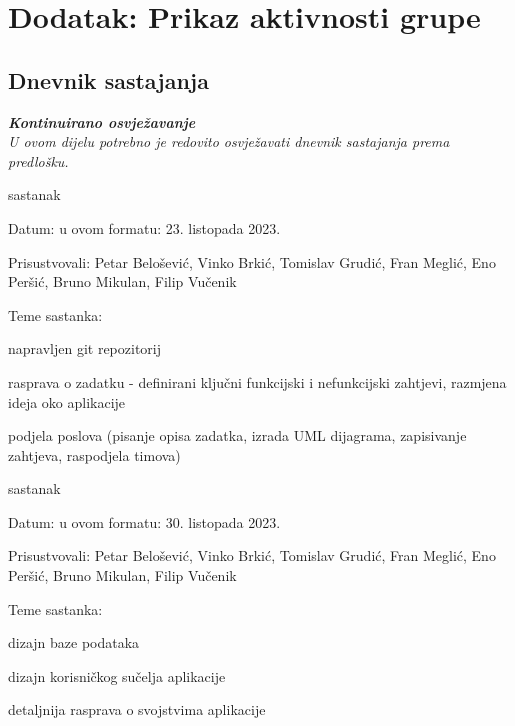 \chapter*{Dodatak: Prikaz aktivnosti grupe}
		
		\section*{Dnevnik sastajanja}
		
		\textbf{\textit{Kontinuirano osvježavanje}}\\
		
		 \textit{U ovom dijelu potrebno je redovito osvježavati dnevnik sastajanja prema predlošku.}
		
		\begin{packed_enum}
			\item  sastanak
			
			\item[] \begin{packed_item}
				\item Datum: u ovom formatu: 23. listopada 2023.
				\item Prisustvovali: Petar Belošević, Vinko Brkić, Tomislav Grudić, Fran Meglić, Eno Peršić, Bruno Mikulan, Filip Vučenik
				\item Teme sastanka:
				\begin{packed_item}
					\item  napravljen git repozitorij
					\item  rasprava o zadatku - definirani ključni funkcijski i nefunkcijski zahtjevi, razmjena ideja oko aplikacije
					\item podjela poslova (pisanje opisa zadatka, izrada UML dijagrama, zapisivanje zahtjeva, raspodjela timova)
				\end{packed_item}
			\end{packed_item}
			
			\item  sastanak
			\item[] \begin{packed_item}
				\item Datum: u ovom formatu: 30. listopada 2023.
				\item Prisustvovali: Petar Belošević, Vinko Brkić, Tomislav Grudić, Fran Meglić, Eno Peršić, Bruno Mikulan, Filip Vučenik
				\item Teme sastanka:
				\begin{packed_item}
					\item  dizajn baze podataka
					\item  dizajn korisničkog sučelja aplikacije
					\item detaljnija rasprava o svojstvima aplikacije
				\end{packed_item}
			\end{packed_item}
			

\end{packed_enum}
